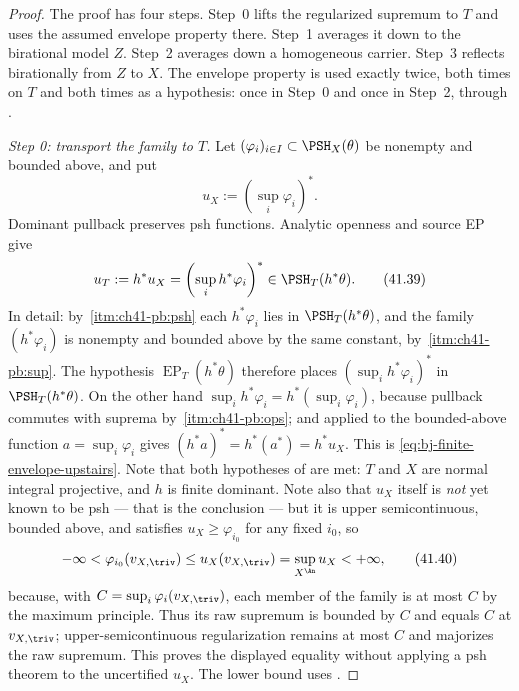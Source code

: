 \begin{proof}
The proof has four steps.  Step~0 lifts the regularized supremum to $T$
and uses the assumed envelope property there.  Step~1 averages it down to
the birational model $Z$.  Step~2 averages down a homogeneous carrier.
Step~3 reflects birationally from $Z$ to $X$.  The envelope property is
used exactly twice, both times on $T$ and both times as a hypothesis:
once in Step~0 and once in Step~2, through
.

\medskip
\noindent\emph{Step 0: transport the family to $T$.}
Let $(\varphi_i)_{i\in I}\subset\PSH_X(\theta)$ be nonempty and bounded
above, and put
\[
                         u_X:=\left(\sup_i\varphi_i\right)^*.
\tag{41.38}\label{eq:bj-finite-envelope-downstairs}
\]
Dominant pullback preserves psh functions.  Analytic openness and source
EP give
\[
 u_T:=h^*u_X
     =\left(\sup_i h^*\varphi_i\right)^*
     \in\PSH_T(h^*\theta).
\tag{41.39}\label{eq:bj-finite-envelope-upstairs}
\]
In detail: by
\,\cref{itm:ch41-pb:psh} each
$h^*\varphi_i$ lies in $\PSH_T(h^*\theta)$, and the family
$(h^*\varphi_i)$ is nonempty and bounded above by the same constant, by
\,\cref{itm:ch41-pb:sup}.  The hypothesis
$\operatorname{EP}_T(h^*\theta)$ therefore places
$(\sup_ih^*\varphi_i)^*$ in $\PSH_T(h^*\theta)$.  On the other hand
$\sup_ih^*\varphi_i=h^*(\sup_i\varphi_i)$, because pullback commutes with
suprema by
\,\cref{itm:ch41-pb:ops}; and
 applied to the bounded-above function
$a=\sup_i\varphi_i$ gives
$(h^*a)^*=h^*(a^*)=h^*u_X$.  This is
\eqref{eq:bj-finite-envelope-upstairs}.  Note that both hypotheses of
 are met: $T$ and $X$ are normal
integral projective, and $h$ is finite dominant.  Note also that
$u_X$ itself is \emph{not} yet known to be psh --- that is the conclusion
--- but it is upper semicontinuous, bounded above, and satisfies
$u_X\ge\varphi_{i_0}$ for any fixed $i_0$, so
\[
 -\infty<\varphi_{i_0}(v_{X,\triv})\le u_X(v_{X,\triv})
 =\sup_{X^{\An}}u_X<+\infty,
\tag{41.40}\label{eq:ch41-uX-finite-at-triv}
\]
because, with $C=\sup_i\varphi_i(v_{X,\triv})$, each member of
the family is at most $C$ by the maximum principle.
Thus its raw supremum is bounded by $C$ and equals $C$ at
$v_{X,\triv}$; upper-semicontinuous regularization remains at most
$C$ and majorizes the raw supremum.  This proves the displayed equality
without applying a psh theorem to the uncertified $u_X$.
The lower bound uses .


\end{proof}
